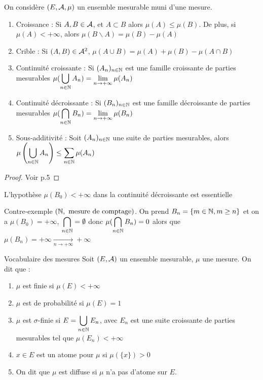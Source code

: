 \documentclass[]{report}
\begin{document}
\begin{prop}{}{}
    On considère $(E,\mathcal{A},\mu)$ un ensemble mesurable muni d'une mesure.
    \begin{enumerate}
        \item Croissance : Si $A,B\in\mathcal{A}$, et $A\subset B$ alors $\mu(A)\le\mu(B)$. De plus, si $\mu(A)<+\infty$, alors $\mu(B\backslash A)=\mu(B)-\mu(A)$
        \item Crible : Si $(A,B)\in\mathcal{A}^2$, $\mu(A\cup B)=\mu(A)+\mu(B)-\mu(A\cap B)$
        \item Continuité croissante : Si $(A_n)_{{n\in\mathbb{N}}}$ est une famille croissante de parties mesurables $\displaystyle{\mu(\bigcup_{{n\in\mathbb{N}}}A_n)=\lim_{n\to+\infty}\mu(A_n)}$
        \item Continuité décroissante : Si $(B_n)_{{n\in\mathbb{N}}}$ est une famille décroissante de parties mesurables $\displaystyle{\mu(\bigcap_{{n\in\mathbb{N}}}B_n)=\lim_{n\to+\infty}\mu(B_n)}$
        \item Sous-additivité : Soit $(A_n)_{{n\in\mathbb{N}}}$ une suite de parties mesurables, alors $\displaystyle{\mu\left(\bigcup_{{n\in\mathbb{N}}}A_n\right)\le\sum_{{n\in\mathbb{N}}}\mu(A_n)}$
    \end{enumerate}
\end{prop}

\begin{proof}{}{}
    Voir p.5
\end{proof}

\begin{re}{}{}
    L'hypothèse $\mu(B_0)<+\infty$ dans la continuité décroissante est essentielle
\end{re}

\begin{ex}{Contre-exemple}{}
    $(\mathbb{N},\text{ mesure de comptage})$. On prend $B_n=\{m\in\mathbb{N},m\ge n\}$ et on a $\mu(B_0)=+\infty$, $\displaystyle{\bigcap_{{n\in\mathbb{N}}}=\emptyset}$ donc $\displaystyle{\mu(\bigcap_{{n\in\mathbb{N}}}B_n)=0}$ alors que $\displaystyle{\mu(B_n)=+\infty\xrightarrow[n\to+\infty]{}+\infty}$
\end{ex}

\begin{df}{Vocabulaire des mesures}{}
    Soit $(E,\mathcal{A})$ un ensemble mesurable, $\mu$ une mesure.
    On dit que :
    \begin{enumerate}
        \item $\mu$ est finie si $\mu(E)<+\infty$
        \item $\mu$ est de probabilité si $\mu(E)=1$
        \item $\mu$ est $\sigma$-finie si $\displaystyle{E=\bigcup_{{n\in\mathbb{N}}}E_n}$, avec $E_n$ est une suite croissante de parties mesurables tel que $\mu(E_n)<+\infty$
        \item $x\in E$ est un atome pour $\mu$ si $\mu(\{x\})>0$
        \item On dit que $\mu$ est diffuse si $\mu$ n'a pas d'atome sur $E$.
    \end{enumerate}
\end{df}
\end{document}
